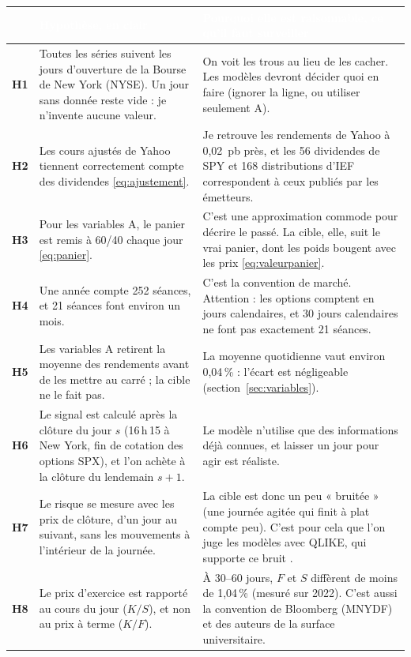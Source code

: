 \documentclass[10pt,a4paper]{article}
\newcommand{\entete}[1]{\textcolor{white}{\bfseries #1}}
\newcommand{\coupure}{\textunderscore\allowbreak}
\newcommand{\fic}[1]{{\small\ttfamily\let\_\coupure #1}}
\begin{document}
{\small
\begin{longtable}{@{}>{\leavevmode\bfseries\color{sarcelle}}p{0.65cm} L{7.4cm} L{9.1cm}@{}}
 & \entete{Hypothèse, en clair} & \entete{Pourquoi elle est raisonnable, ce qu'il faut surveiller} \\
\endhead
H1 & Toutes les séries suivent les jours d'ouverture de la Bourse de New York (NYSE). Un jour sans donnée reste vide : je n'invente aucune valeur. & On voit les trous au lieu de les cacher. Les modèles devront décider quoi en faire (ignorer la ligne, ou utiliser seulement A). \\
H2 & Les cours ajustés de Yahoo tiennent correctement compte des dividendes \eqref{eq:ajustement}. & Je retrouve les rendements de Yahoo à 0,02~pb près, et les 56 dividendes de SPY et 168 distributions d'IEF correspondent à ceux publiés par les émetteurs. \\
H3 & Pour les variables A, le panier est remis à 60/40 chaque jour \eqref{eq:panier}. & C'est une approximation commode pour décrire le passé. La cible, elle, suit le vrai panier, dont les poids bougent avec les prix \eqref{eq:valeurpanier}. \\
H4 & Une année compte 252 séances, et 21 séances font environ un mois. & C'est la convention de marché. Attention : les options comptent en jours calendaires, et 30 jours calendaires ne font pas exactement 21 séances. \\
H5 & Les variables A retirent la moyenne des rendements avant de les mettre au carré ; la cible ne le fait pas. & La moyenne quotidienne vaut environ 0,04\,\% : l'écart est négligeable (section~\ref{sec:variables}). \\
H6 & Le signal est calculé après la clôture du jour $s$ (16\,h\,15 à New York, fin de cotation des options SPX), et l'on achète à la clôture du lendemain $s+1$. & Le modèle n'utilise que des informations déjà connues, et laisser un jour pour agir est réaliste. \\
H7 & Le risque se mesure avec les prix de clôture, d'un jour au suivant, sans les mouvements à l'intérieur de la journée. & La cible est donc un peu « bruitée » (une journée agitée qui finit à plat compte peu). C'est pour cela que l'on juge les modèles avec QLIKE, qui supporte ce bruit \cite{patton}. \\
H8 & Le prix d'exercice est rapporté au cours du jour ($K/S$), et non au prix à terme ($K/F$). & À 30–60 jours, $F$ et $S$ diffèrent de moins de 1,04\,\% (mesuré sur 2022). C'est aussi la convention de Bloomberg (\fic{MNY\_DF}) et des auteurs de la surface universitaire. \\

\end{longtable}}
\end{document}
